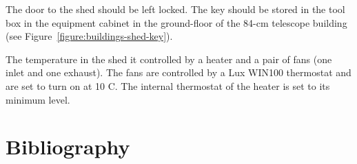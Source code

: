 The door to the shed should be left locked. The key should be stored in the tool box in the equipment cabinet in the ground-floor of the 84-cm telescope building (see Figure~\ref{figure:buildings-shed-key}).

The temperature in the shed it controlled by a heater and a pair of fans (one inlet and one exhaust). The fans are controlled by a Lux WIN100 thermostat and are set to turn on at 10 C. The internal thermostat of the heater is set to its minimum level.



\section{Bibliography}

